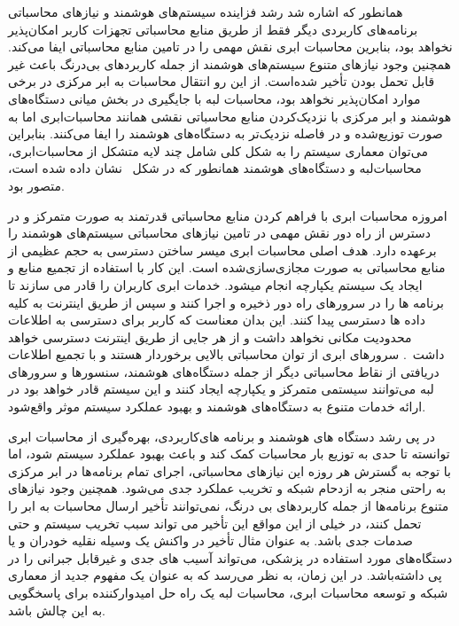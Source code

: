 




همانطور که اشاره شد رشد فزاینده سیستم‌های هوشمند و نیازهای محاسباتی برنامه‌های کاربردی دیگر فقط از طریق منابع محاسباتی تجهزات کاربر امکان‌پذیر نخواهد بود، بنابرین محاسبات ابری نقش مهمی را در تامین منابع محاسباتی ایفا می‌کند. همچنین وجود نیازهای متنوع سیستم‌های هوشمند از جمله کاربردهای بی‌درنگ باعث غیر قابل تحمل بودن تأخیر شده‌است. از این رو انتقال محاسبات به ابر مرکزی در برخی موارد امکان‌پذیر نخواهد بود، محاسبات لبه با جایگیری در بخش میانی دستگاه‌های هوشمند و ابر مرکزی با نزدیک‌کردن منابع محاسباتی نقشی همانند محاسبات‌ابری اما به صورت توزیع‌شده و در فاصله نزدیک‌تر به دستگاه‌های هوشمند را ایفا می‌کنند. بنابراین می‌توان معماری سیستم را به شکل کلی شامل چند لایه متشکل از محاسبات‌ابری، محاسبات‌لبه و دستگاه‌های هوشمند همانطور که در شکل~ نشان داده شده است، متصور بود.




امروزه محاسبات ابری با فراهم کردن منابع محاسباتی قدرتمند به صورت متمرکز و در دسترس از راه دور نقش مهمی در تامین نیازهای محاسباتی سیستم‌های هوشمند را برعهده دارد. هدف اصلی محاسبات ابری میسر ساختن دسترسی به حجم عظیمی از منابع محاسباتی به صورت مجازی‌سازی‌شده است. این کار با استفاده از تجمیع منابع و ایجاد یک سیستم یکپارچه انجام میشود. خدمات ابری کاربران را قادر می سازند تا برنامه ها را در سرورهای راه دور ذخیره و اجرا کنند و سپس از طریق اینترنت به کلیه داده ها دسترسی پیدا کنند. این بدان معناست که کاربر برای دسترسی به اطلاعات محدودیت مکانی نخواهد داشت و از هر جایی از طریق اینترنت دسترسی خواهد داشت~\cite{gonzalez2015cloud}. سرورهای ابری از توان محاسباتی بالایی برخوردار هستند و با تجمیع اطلاعات دریافتی از نقاط محاسباتی دیگر از جمله دستگاه‌های هوشمند، سنسورها و سرورهای لبه می‌توانند سیستمی متمرکز و یکپارچه ایجاد کنند و این سیستم قادر خواهد بود در ارائه خدمات متنوع به دستگاه‌های هوشمند و بهبود عملکرد سیستم موثر واقع‌شود.



در پی رشد دستگاه های هوشمند و برنامه های‌کاربردی، بهره‌گیری از محاسبات ابری توانسته تا حدی به توزیع بار محاسبات کمک کند و باعث بهبود عملکرد سیستم شود، اما با توجه به گسترش هر روزه این نیازهای محاسباتی، اجرای تمام برنامه‌ها در ابر مرکزی به راحتی منجر به ازدحام شبکه و تخریب عملکرد جدی می‌شود. همچنین وجود نیازهای متنوع برنامه‌ها از جمله کاربردهای بی درنگ، نمی‌توانند تأخیر ارسال محاسبات به ابر را تحمل کنند، در خیلی از این مواقع این تأخیر می تواند سبب تخریب سیستم و حتی صدمات جدی باشد. به عنوان مثال تأخیر در واکنش یک وسیله نقلیه خودران و یا دستگاه‌های مورد استفاده در پزشکی، می‌تواند آسیب های جدی و غیرقابل جبرانی را در پی داشته‌باشد. در این زمان، به نظر می‌رسد که به عنوان یک مفهوم جدید از معماری شبکه و توسعه محاسبات ابری، محاسبات لبه یک راه حل امیدوارکننده برای پاسخگویی به این چالش باشد. 

